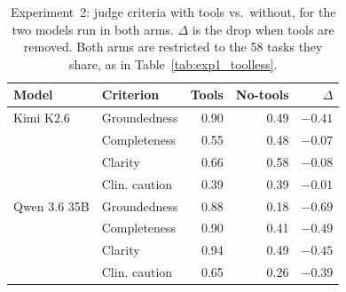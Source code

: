\begin{table}[H]
\centering
\caption{Experiment~2: judge criteria with tools vs.\ without, for the two models run in both arms. $\Delta$ is the drop when tools are removed. Both arms are restricted to the 58 tasks they share, as in Table~\ref{tab:exp1_toolless}.}
\label{tab:exp1_judge_toolless}
\small
\setlength{\tabcolsep}{5pt}
\begin{tabular}{@{}llrrr@{}}
\toprule
Model & Criterion & Tools & No-tools & $\Delta$ \\
\midrule
Kimi K2.6 & Groundedness & 0.90 & 0.49 & $-0.41$ \\
 & Completeness & 0.55 & 0.48 & $-0.07$ \\
 & Clarity & 0.66 & 0.58 & $-0.08$ \\
 & Clin. caution & 0.39 & 0.39 & $-0.01$ \\
\addlinespace
Qwen 3.6 35B & Groundedness & 0.88 & 0.18 & $-0.69$ \\
 & Completeness & 0.90 & 0.41 & $-0.49$ \\
 & Clarity & 0.94 & 0.49 & $-0.45$ \\
 & Clin. caution & 0.65 & 0.26 & $-0.39$ \\
\bottomrule
\end{tabular}
\end{table}
